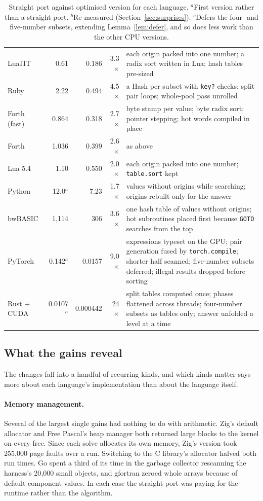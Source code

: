 \documentclass[11pt,a4paper]{article}
\theoremstyle{definition}
\theoremstyle{remark}
\begin{document}
\begin{table}[p]
\begin{tabular}{@{}lrrrp{9.5cm}@{}}
LuaJIT & 0.61 & 0.186 & 3.3$\times$ & each origin packed into one number; a radix sort written in Lua; hash tables pre-sized \\
Ruby & 2.22 & 0.494 & 4.5$\times$ & a Hash per subset with \texttt{key?} checks; split pair loops; whole-pool pass unrolled \\
Forth (fast) & 0.864 & 0.318 & 2.7$\times$ & byte stamp per value; byte radix sort; pointer stepping; hot words compiled in place \\
Forth & 1.036 & 0.399 & 2.6$\times$ & as above \\
Lua 5.4 & 1.10 & 0.550 & 2.0$\times$ & each origin packed into one number; \texttt{table.sort} kept \\
Python & 12.0$^a$ & 7.23 & 1.7$\times$ & values without origins while searching; origins rebuilt only for the answer \\
bwBASIC & 1{,}114 & 306 & 3.6$\times$ & one hash table of values without origins; hot subroutines placed first because \texttt{GOTO} searches from the top \\ \midrule
PyTorch & 0.142$^a$ & 0.0157 & 9.0$\times$ & expressions typeset on the GPU; pair generation fused by \texttt{torch.compile}; shorter half scanned; five-number subsets deferred; illegal results dropped before sorting \\
Rust + CUDA & 0.0107$^a$ & 0.000442 & 24$\times$ & split tables computed once; phases flattened across threads; four-number subsets as tables only; answer unfolded a level at a time \\ \bottomrule
\end{tabular}
\caption{Straight port against optimised version for each language. $^a$First version rather than a
straight port. $^b$Re-measured (Section~\ref{sec:surprises}). $^c$Defers the four- and five-number subsets, extending Lemma~\ref{lem:defer}, and so does less work than the other CPU versions.}\label{tab:opt}
\end{table}

\subsection{What the gains reveal}

The changes fall into a handful of recurring kinds, and which kinds matter says more about each language's
implementation than about the language itself.

\paragraph{Memory management.}
Several of the largest single gains had nothing to do with arithmetic. Zig's default allocator and Free
Pascal's heap manager both returned large blocks to the kernel on every free. Since each solve allocates
its own memory, Zig's version took 255{,}000 page faults over a run. Switching to the C library's allocator halved
both run times. Go spent a third of its time in the garbage collector rescanning the harness's 20{,}000
small objects, and gfortran zeroed whole arrays because of default component values. In each case the
straight port was paying for the runtime rather than the algorithm.
\end{document}
